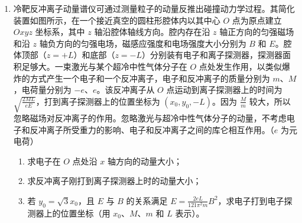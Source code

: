 \documentclass[\gkver]{gaokaozhenti}
\begin{document}
\begin{enumerate}
{（2）当 $F=F_2$ 时，A 开始向下滑动，对 B 有 $\mu_2N_2=mg$，$N_2=ma_2$，得
\[
a_2=20\,\Umsq
\]
对 A 有 $f_1=\mu_1ma_2$，得 $f_1=2.5\,\UN$。

对箱子有 $N_3=Mg+f_1'+mg$，其中 $f_1'=f_1$，得 $N_3=27.5\,\UN$。

对整体有
\[
F_2-\mu N_3=(M+2m)a_2
\]
得 $F_2=76.5\,\UN$。

对 A 有
\[
mg-\mu_1ma_2=ma_y
\]
得 $a_y=5\,\Umsq$。

有
\[
y=\frac{1}{2}a_y(t_2-t_1)^2,\qquad W=-f_1y
\]
联立可得 $W=-6.25\,\UJ$。
}

\item
冷靶反冲离子动量谱仪可通过测量粒子的动量反推出碰撞动力学过程。其简化装置如图所示，在一个接近真空的圆柱形腔体内以其中心 $O$ 点为原点建立 $Oxyz$ 坐标系，其中 $z$ 轴沿腔体轴线方向。腔内存在沿 $z$ 轴正方向的匀强磁场和沿 $z$ 轴负方向的匀强电场，磁感应强度和电场强度大小分别为 $B$ 和 $E$。腔体顶部（$z=+L$）和底部（$z=-L$）分别装有电子和离子探测器，探测器面积足够大。一束激光与某个超冷中性气体分子在 $O$ 点处发生作用，以类似爆炸的方式产生一个电子和一个反冲离子，电子和反冲离子的质量分别为 $m$、$M$，电荷量分别为 $-e$、$e$。该反冲离子从 $O$ 点运动到离子探测器上的时间为 $\sqrt{\frac{2ML}{eE}}$，打到离子探测器上的位置坐标为 $(x_0,y_0,-L)$。因为 $\frac{M}{m}$ 较大，所以忽略磁场对反冲离子的作用。忽略激光与超冷中性气体分子的动量，不考虑电子和反冲离子所受重力的影响、电子和反冲离子之间的库仑相互作用。（$e$ 为元电荷）
\begin{enumerate}
	\item
	求电子在 $O$ 点处沿 $x$ 轴方向的动量大小；
	\item
	求反冲离子刚打到离子探测器上时的动量大小；
	\item
	若 $y_0=\sqrt{3}x_0$，且 $E$ 与 $B$ 的关系满足 $E=\frac{2eL}{121\pi^2m}B^2$，求电子打到电子探测器上的位置坐标（用 $x_0$、$M$、$m$ 和 $L$ 表示）。
\end{enumerate}
\end{enumerate}
\end{document}
